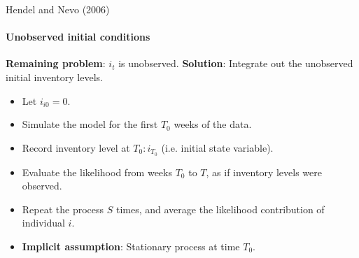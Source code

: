 \documentclass[11pt,aspectratio=169]{beamer}
\begin{document}

\begin{frame}{Hendel and Nevo (2006)}
\framesubtitle{Unobserved initial conditions}
\textbf{Remaining problem}: $i_t$ is unobserved. \textbf{Solution}: Integrate out the unobserved initial inventory levels.
\vspace{0.3cm}

\begin{itemize}\footnotesize
\item[$-$] Let $i_{i0} = 0$.
\item[$-$] Simulate the model for the first $T_0$ weeks of the data.
\item[$-$] Record inventory level at $T_0: i_{T_0}$ (i.e. initial state variable).
\item[$-$] Evaluate the likelihood from weeks $T_0$ to $T$, as if inventory levels were observed.
\item[$-$] Repeat the process $S$ times, and average the likelihood contribution
of individual $i$.
\item[$-$] \textbf{Implicit assumption}: Stationary process at time $T_0$.
\end{itemize}
\end{frame}





\end{document}
